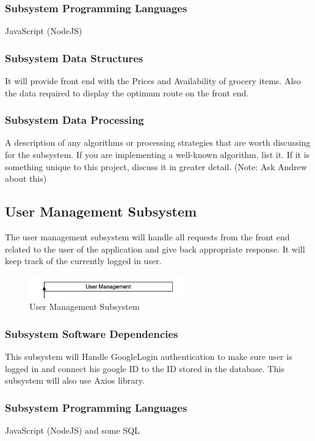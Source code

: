 \subsubsection{Subsystem Programming Languages}
JavaScript (NodeJS)

\subsubsection{Subsystem Data Structures}
It will provide front end with the Prices and Availability of grocery items. Also the data required to display the optimum route on the front end.

\subsubsection{Subsystem Data Processing}
A description of any algorithms or processing strategies that are worth discussing for the subsystem. If you are implementing a well-known algorithm, list it. If it is something unique to this project, discuss it in greater detail. 
(Note: Ask Andrew about this)


\subsection{User Management Subsystem}
The user management subsystem will handle all requests from the front end related to the user of the
application and give back appropriate response. It will keep track of the currently logged in user.

\begin{figure}[h!]
	\centering
 	\includegraphics[width=0.60\textwidth]{images/UserManagement.png}
 \caption{User Management Subsystem}
\end{figure}


\subsubsection{Subsystem Software Dependencies}
This subsystem will Handle GoogleLogin authentication to make sure user is logged in and connect his google ID to the ID stored in the database. This subsystem will also use Axios library.

\subsubsection{Subsystem Programming Languages}
JavaScript (NodeJS) and some SQL

